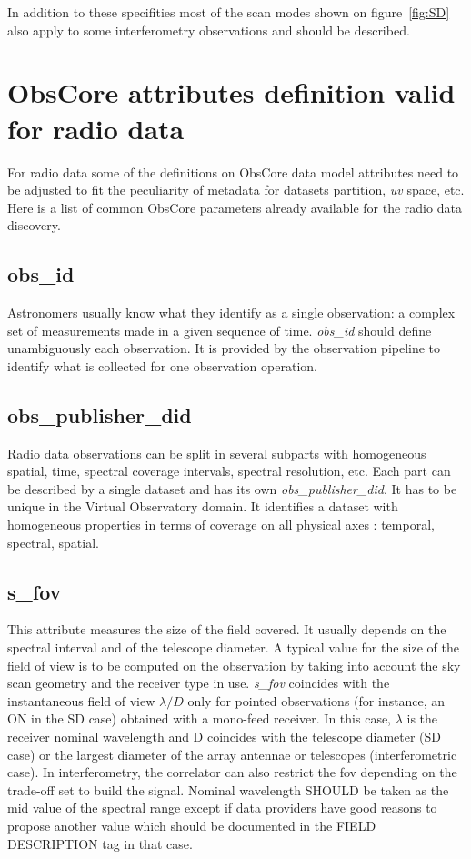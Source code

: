 \documentclass[11pt,a4paper]{ivoa}
\begin{document}
In addition to these specifities most of the scan modes shown on figure~\ref{fig:SD} also
apply to some interferometry observations and should be described.

\section{ObsCore attributes definition valid for radio data}
\label{sec:ObsCoreRadDef}

For radio data some of the definitions on ObsCore data model attributes need to be adjusted
to fit the peculiarity of metadata for datasets partition, \emph{uv} space, etc.
Here is a list of common ObsCore parameters already available for the radio data discovery.

\subsection{obs\_id}

Astronomers usually know what they identify as a single observation: a complex set of
measurements made in a given sequence of time. \emph{obs\_id} should define unambiguously each
observation. It is provided by the observation pipeline to identify what is collected for one observation operation.

\subsection{obs\_publisher\_did}

Radio data observations can be split in several subparts with homogeneous spatial,
time, spectral coverage intervals, spectral resolution, etc. Each part can be described by
a single dataset and has its own \emph{obs\_publisher\_did}. It has to be unique in the
Virtual Observatory domain.
It identifies a dataset with homogeneous properties in terms of coverage on all physical axes : temporal, spectral, spatial.

\subsection{s\_fov}
\label{sec:fov}
This attribute measures the size of the field covered. 
It usually depends on the spectral interval and of the telescope diameter.
A typical value for  the size of the field of view is to be computed on the observation by taking into account the sky scan geometry and the receiver type in use.
\emph{s\_fov } coincides with the instantaneous field of view $\lambda / D$ only for pointed observations (for instance, an ON in the SD case) obtained with a mono-feed receiver. In this case, $\lambda$ is the
receiver nominal wavelength and D coincides with the telescope diameter (SD case) or the largest diameter of the array antennae or telescopes (interferometric case).
In interferometry, the correlator can also restrict the fov depending on the trade-off set to build the signal. 
Nominal wavelength SHOULD be taken as the mid value of the spectral range except if data providers have good reasons to propose another value which should be documented in the FIELD DESCRIPTION tag in that case. 
\end{document}
